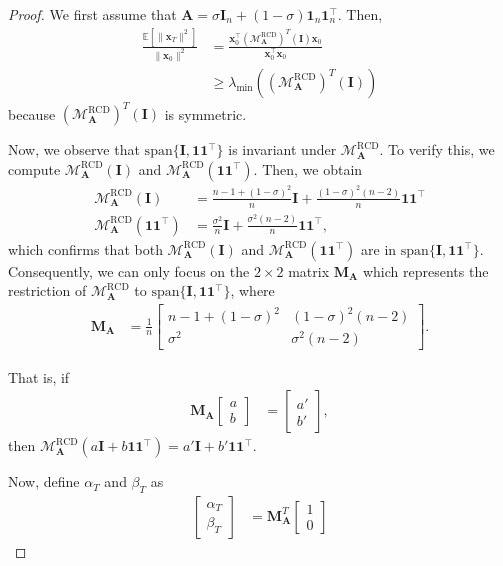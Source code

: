\documentclass{article}
\theoremstyle{plain}
\theoremstyle{definition}
\theoremstyle{remark}
\def\bigclosed#1{\left[#1\right]}
\renewcommand{\sp}{\mathrm{span}}
\newcommand{\RCD}{\text{RCD}} %
\newcommand{\MARCD}{\mathcal{M}_{\bm{A}}^{\RCD}} %
\def\vone{{\bm{1}}}
\def\vx{{\bm{x}}}
\def\mA{{\bm{A}}}
\def\mI{{\bm{I}}}
\def\mM{{\bm{M}}}
\newcommand{\E}{\mathbb{E}}
\begin{document}
\begin{proof}

We first assume that $\mA = \sigma \mI_n + (1-\sigma) \vone_n \vone_n^{\top}$. Then, 
\begin{align*}
    \frac{\E\bigclosed{\|\vx_T\|^2}}{\|\vx_0\|^2} &= \frac{\vx_0^{\top} (\MARCD)^T (\mI) \vx_0}{\vx_0^{\top} \vx_0} \\
    &\ge \lambda_{\min} ((\MARCD)^T (\mI))
\end{align*}
because $(\MARCD)^T (\mI)$ is symmetric. 

Now, we observe that $\sp\{\mI, \vone \vone^{\top}\}$ is invariant under $\MARCD$. To verify this, we compute $\MARCD(\mI)$ and $\MARCD(\vone \vone^{\top})$. Then, we obtain 
\begin{align*}
    \MARCD(\mI) &= \frac{n-1+(1-\sigma)^2}{n}\mI+\frac{(1-\sigma)^2(n-2)}{n}\vone \vone^{\top} \\
    \MARCD(\vone \vone^{\top}) &= \frac{\sigma^2}{n}\mI+\frac{\sigma^2(n-2)}{n}\vone \vone^{\top},
\end{align*}
which confirms that both $\MARCD(\mI)$ and $\MARCD(\vone \vone^{\top})$ are in $\sp\{\mI, \vone \vone^{\top}\}$. Consequently, we can only focus on the $2\times 2$ matrix $\mM_{\mA}$ which represents the restriction of $\MARCD$ to $\sp\{\mI, \vone \vone^{\top}\}$, where 
\begin{align*}
    \mM_{\mA} &= \frac{1}{n}\begin{bmatrix}
        n-1+(1-\sigma)^2 & (1-\sigma)^2 (n-2) \\
        \sigma^2 & \sigma^2 (n-2)
    \end{bmatrix}.
\end{align*}

That is, if
\begin{align*}
    \mM_{\mA} \begin{bmatrix}
    a\\
    b
\end{bmatrix} &= \begin{bmatrix}
    a'\\
    b'
\end{bmatrix},
\end{align*}
then $\MARCD(a\mI + b \vone \vone^{\top}) = a'\mI + b' \vone \vone^{\top}$.

Now, define $\alpha_T$ and $\beta_T$ as 
\begin{align*}
    \begin{bmatrix}
        \alpha_T\\
        \beta_T
    \end{bmatrix} &= \mM_{\mA}^T 
    \begin{bmatrix}
        1\\
        0
    \end{bmatrix}
\end{align*}


\end{proof}
\end{document}
